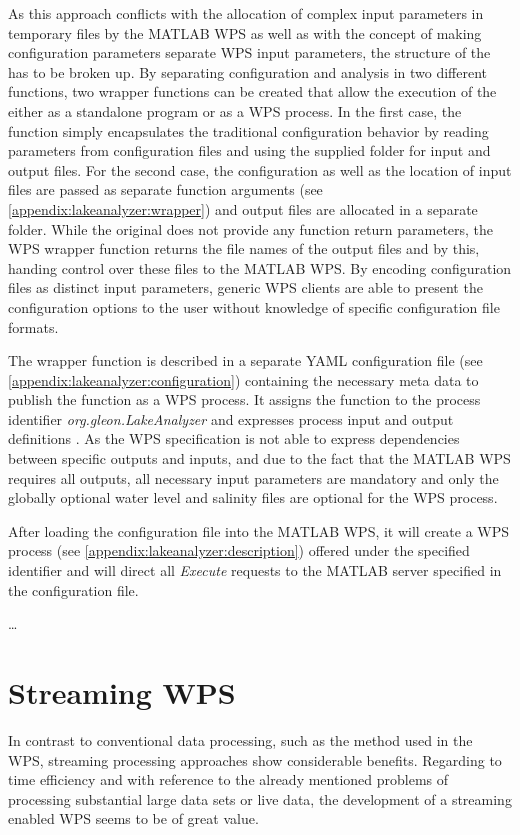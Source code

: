     As this approach conflicts with the allocation of complex input parameters in temporary files by the MATLAB WPS as well as with the concept of making configuration parameters separate \ac{WPS} input parameters, the structure of the \la has to be broken up. By separating configuration and analysis in two different functions, two wrapper functions can be created that allow the execution of the \la either as a standalone program or as a WPS process. In the first case, the function simply encapsulates the traditional configuration behavior by reading parameters from configuration files and using the supplied folder for input and output files. For the second case, the configuration as well as the location of input files are passed as separate function arguments (see \cref{appendix:lakeanalyzer:wrapper}) and output files are allocated in a separate folder. While the original \la does not provide any function return parameters, the WPS wrapper function returns the file names of the output files and by this, handing control over these files to the MATLAB WPS. By encoding configuration files as distinct input parameters, generic WPS clients are able to present the configuration options to the user without knowledge of specific configuration file formats.

    The wrapper function is described in a separate YAML configuration file (see \cref{appendix:lakeanalyzer:configuration}) containing the necessary meta data to publish the function as a WPS process. It assigns the function to the process identifier \emph{org.gleon.LakeAnalyzer} and expresses process input and output definitions \citep[taken from the LakeAnalyzer user manual,][]{lamanual}. As the WPS specification is not able to express dependencies between specific outputs and inputs, and due to the fact that the MATLAB WPS requires all outputs, all necessary input parameters are mandatory and only the globally optional water level and salinity files are optional for the WPS process.

    After loading the configuration file into the MATLAB WPS, it will create a WPS process (see \cref{appendix:lakeanalyzer:description}) offered under the specified identifier and will direct all \emph{Execute} requests to the MATLAB server specified in the configuration file.

    \dots

\chapter{Streaming WPS}
  In contrast to conventional data processing, such as the method used in the \ac{WPS}, streaming processing approaches show considerable benefits. Regarding to time efficiency and with reference to the already mentioned problems of processing substantial large data sets or live data, the development of a streaming enabled \ac{WPS} seems to be of great value.


